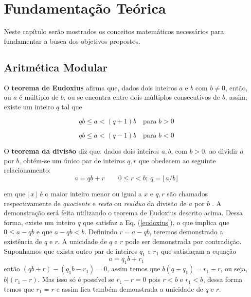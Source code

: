 \chapter{Fundamentação Teórica}
Neste capítulo serão mostrados os conceitos matemáticos necessários para fundamentar a busca dos objetivos propostos.

%
%
\section{Aritmética Modular}

O \textbf{teorema de Eudoxius} afirma que, dados dois inteiros \(a\) e \(b\) com \(b \neq 0\), então, ou \(a\) é múltiplo de \(b\), ou se encontra entre dois múltiplos 
consecutivos de \(b\), assim, existe um inteiro \(q\) tal que \cite{Santos:2014}

\begin{equation} \label{eudoxius}
  qb \leq a < (q + 1)b\quad\mbox{para \(b > 0\)}
\end{equation}

\begin{equation}
  qb \leq a < (q - 1)b\quad\mbox{para \(b < 0\)}
\end{equation}

O \textbf{teorema da divisão} diz que: dados dois inteiros $a, b$, com $b > 0$, ao dividir \(a\) por \(b\), obtém-se um único par de inteiros $q, r$ que obedecem ao seguinte relacionamento:
\begin{equation}
  a=qb+r \qquad 0 \leq r<b;\ q=\lfloor a/b \rfloor
\end{equation}

em que $\lfloor x \rfloor$ é o maior inteiro menor ou igual a \(x\) e $q,r$ são chamados respectivamente de \textit{quociente} e \textit{resto} ou \textit{resíduo} da divisão de \(a\) por \(b\) \cite{Santos:2014}. A demonstração será feita utilizando o teorema de Eudoxius descrito acima. Dessa forma, existe um inteiro \(q\) que satisfaz a Eq. (\ref{eudoxius}), o que implica que \(0 \leq a - qb\) e que \(a - qb < b\). Definindo \(r = a - qb\), teremos demonstrado a existência de \(q\) e \(r\). A unicidade de \(q\) e 
\(r\) pode ser demonstrada por contradição. Suponhamos que exista outro par de inteiros \(q_1\) e \(r_1\) que satisfaçam a equação
\begin{equation}
  a = q_1b + r_1
\end{equation}
então \((qb + r) - (q_1b - r_1) = 0\), assim temos que \(b(q - q_1) = r_1 - r\), ou seja, \(b|(r_1 - r)\). Mas isso só é possível se \(r_1 - r = 0\) 
pois \(r < b\) e \(r_1 < b\), dessa forma temos que \(r_1 = r\) 
e assim fica também demonstrada a unicidade de \(q\) e \(r\). \cite{Santos:2014}


